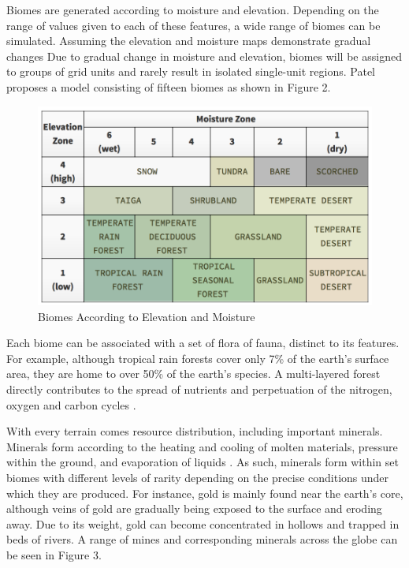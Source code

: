 Biomes are generated according to moisture and elevation. Depending on the range of values given to each of these features, a wide range of biomes can be simulated. Assuming the elevation and moisture maps demonstrate gradual changes Due to gradual change in moisture and elevation, biomes will be assigned to groups of grid units and rarely result in isolated single-unit regions. Patel proposes a model consisting of fifteen biomes as shown in Figure 2.

\begin{figure}
\includegraphics[width=\textwidth]{Biomes.png}
\caption{Biomes According to Elevation and Moisture}
\end{figure}

Each biome can be associated with a set of flora of fauna, distinct to its features. For example, although tropical rain forests cover only 7\% of the earth's surface area, they are home to over 50\% of the earth's species. A multi-layered forest directly contributes to the spread of nutrients and perpetuation of the nitrogen, oxygen and carbon cycles \cite{Robinson:2008:Online}.

With every terrain comes resource distribution, including important minerals. Minerals form according to the heating and cooling of molten materials, pressure within the ground, and evaporation of liquids \cite{9780939950812}. As such, minerals form within set biomes with different levels of rarity depending on the precise conditions under which they are produced. For instance, gold is mainly found near the earth's core, although veins of gold are gradually being exposed to the surface and eroding away. Due to its weight, gold can become concentrated in hollows and trapped in beds of rivers. A range of mines and corresponding minerals across the globe can be seen in Figure 3.

